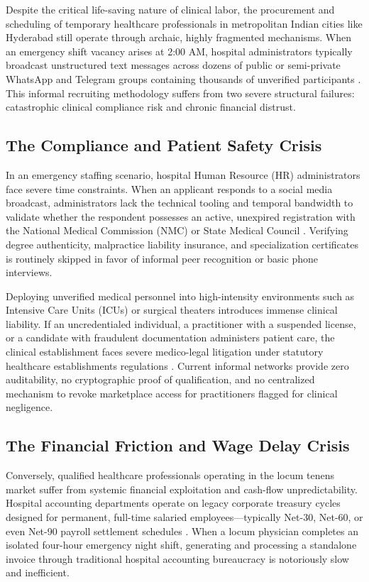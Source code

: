 \documentclass[conference]{IEEEtran}
\begin{document}
Despite the critical life-saving nature of clinical labor, the procurement and scheduling of temporary healthcare professionals in metropolitan Indian cities like Hyderabad still operate through archaic, highly fragmented mechanisms. When an emergency shift vacancy arises at 2:00 AM, hospital administrators typically broadcast unstructured text messages across dozens of public or semi-private WhatsApp and Telegram groups containing thousands of unverified participants \cite{sharma2023informal}. This informal recruiting methodology suffers from two severe structural failures: catastrophic clinical compliance risk and chronic financial distrust.

\subsection{The Compliance and Patient Safety Crisis}
In an emergency staffing scenario, hospital Human Resource (HR) administrators face severe time constraints. When an applicant responds to a social media broadcast, administrators lack the technical tooling and temporal bandwidth to validate whether the respondent possesses an active, unexpired registration with the National Medical Commission (NMC) or State Medical Council \cite{nmc2023register, nmc2023regulations}. Verifying degree authenticity, malpractice liability insurance, and specialization certificates is routinely skipped in favor of informal peer recognition or basic phone interviews.

Deploying unverified medical personnel into high-intensity environments such as Intensive Care Units (ICUs) or surgical theaters introduces immense clinical liability. If an uncredentialed individual, a practitioner with a suspended license, or a candidate with fraudulent documentation administers patient care, the clinical establishment faces severe medico-legal litigation under statutory healthcare establishments regulations \cite{gupta2024legal}. Current informal networks provide zero auditability, no cryptographic proof of qualification, and no centralized mechanism to revoke marketplace access for practitioners flagged for clinical negligence.

\subsection{The Financial Friction and Wage Delay Crisis}
Conversely, qualified healthcare professionals operating in the locum tenens market suffer from systemic financial exploitation and cash-flow unpredictability. Hospital accounting departments operate on legacy corporate treasury cycles designed for permanent, full-time salaried employees---typically Net-30, Net-60, or even Net-90 payroll settlement schedules \cite{verma2023wage}. When a locum physician completes an isolated four-hour emergency night shift, generating and processing a standalone invoice through traditional hospital accounting bureaucracy is notoriously slow and inefficient.
\end{document}
